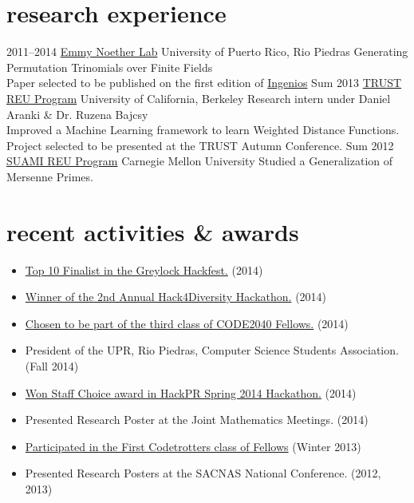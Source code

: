 \documentclass[]{friggeri-cv}
\begin{document}
\section{research experience}

\begin{entrylist}
\entry
{2011--2014}
{\href{http://ccom.uprrp.edu/~labemmy/?page_id=868}{Emmy Noether Lab}}
{University of Puerto Rico, Rio Piedras}
{Generating Permutation Trinomials over Finite Fields \\
Paper selected to be published on the first edition of \href{http://www.ingeniosupr.com/}{Ingenios}}
\entry
{Sum 2013}
{\href{https://www.truststc.org/education/reu/13/index.html}{TRUST REU Program}}
{University of California, Berkeley}
{Research intern under Daniel Aranki \& Dr. Ruzena Bajcsy \\
Improved a Machine Learning framework to learn Weighted Distance Functions. \\
Project selected to be presented at the TRUST Autumn Conference.}
\entry
{Sum 2012}
{\href{http://www.math.cmu.edu/cna/summer_institute.html}{SUAMI REU Program}}
{Carnegie Mellon University}
{Studied a Generalization of Mersenne Primes.}
\end{entrylist}


\section{recent activities \& awards}
\begin{itemize}
\item \href{http://greylocku.com/hackfest/}{Top 10 Finalist in the Greylock Hackfest.} (2014)
\item \href{https://www.eventbrite.com/e/2nd-annual-hack4diversity-closing-the-gap-tickets-11888106647}{Winner of the 2nd Annual Hack4Diversity Hackathon.} (2014)
\item \href{http://code2040.org}{Chosen to be part of the third class of CODE2040 Fellows.} (2014)
\item President of the UPR, Rio Piedras, Computer Science Students Association. (Fall 2014)
\item \href{https://github.com/chrisrodz/gh-backups}{Won Staff Choice award in HackPR Spring 2014 Hackathon.} (2014)
\item Presented Research Poster at the Joint Mathematics Meetings. (2014)
\item \href{http://codetrotters.com}{Participated in the First Codetrotters class of Fellows} (Winter 2013)
\item Presented Research Posters at the SACNAS National Conference. (2012, 2013)
\end{itemize}
\end{document}

